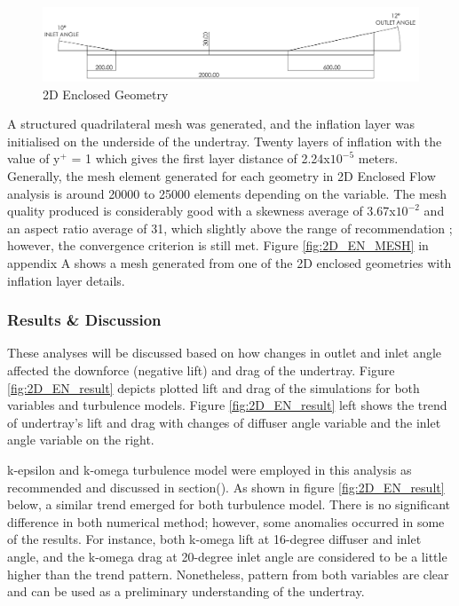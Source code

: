 \begin{figure}[!ht]
    \centering
    \includegraphics[scale=0.18]{Figures/2D_EN/2D_EN_D.PNG}
    \caption{2D Enclosed Geometry}
    \label{fig:2D_EN_Geom}
\end{figure}
  
\noindent A structured quadrilateral mesh was generated, and the inflation layer was initialised on the underside of the undertray. Twenty layers of inflation with the value of y$^+$ = 1 which gives the first layer distance of 2.24x$10^{-5}$ meters. Generally, the mesh element generated for each geometry in 2D Enclosed Flow analysis is around 20000 to 25000 elements depending on the variable. The mesh quality produced is considerably good with a skewness average of 3.67x$10^{-2}$ and an aspect ratio average of 31, which slightly above the range of recommendation \cite{Lanfrit2005BestFLUENT}; however, the convergence criterion is still met. Figure \ref{fig:2D_EN_MESH} in appendix A shows a mesh generated from one of the 2D enclosed geometries with inflation layer details.

\subsubsection{Results \& Discussion}
These analyses will be discussed based on how changes in outlet and inlet angle affected the downforce (negative lift) and drag of the undertray. Figure \ref{fig:2D_EN_result} depicts plotted lift and drag of the simulations for both variables and turbulence models. Figure \ref{fig:2D_EN_result} left shows the trend of undertray's lift and drag with changes of diffuser angle variable and the inlet angle variable on the right. 

\noindent k-epsilon and k-omega turbulence model were employed in this analysis as recommended\cite{} and discussed in section(). As shown in figure \ref{fig:2D_EN_result} below, a similar trend emerged for both turbulence model. There is no significant difference in both numerical method; however,  some anomalies occurred in some of the results. For instance, both k-omega lift at 16-degree diffuser and inlet angle, and the k-omega drag at 20-degree inlet angle are considered to be a little higher than the trend pattern. Nonetheless, pattern from both variables are clear and can be used as a preliminary understanding of the undertray.

